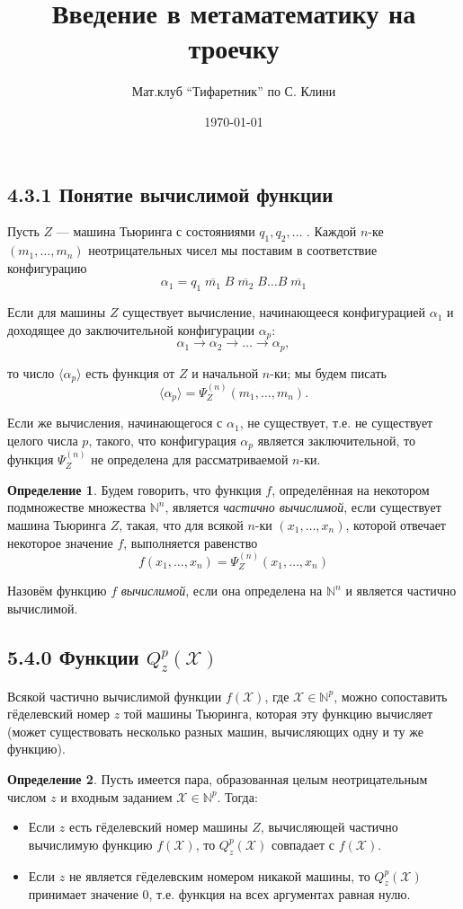 \documentclass[a4paper, 12pt]{article}  %
\author{Мат.клуб ``Тифаретник'' по С. Клини}
\title{Введение в метаматематику на троечку}
\date{\today}
\theoremstyle{definition}
\newtheorem*{definition}{Определение}
\begin{document}
	\subsection*{4.3.1 Понятие вычислимой функции}
		
		Пусть $Z$ --- машина Тьюринга с состояниями $q_1, q_2, \dots$ . Каждой $n$-ке $(m_1, \dots, m_n)$
		неотрицательных чисел мы поставим в соответствие конфигурацию 
			$$ \alpha_1 = q_1 \; \overline{m_1} \; B \; \overline{m_2} \; B \dots B \; \overline{m_1} $$
		
		Если для машины $Z$ существует вычисление, начинающееся конфигурацией $\alpha_1$ и доходящее до
		заключительной конфигурации $\alpha_p$:
			$$ \alpha_1 \rightarrow \alpha_2 \rightarrow \dots \rightarrow \alpha_p ,$$
		
		то число $\langle \alpha_p \rangle$ есть функция от $Z$ и начальной $n$-ки; мы будем писать
			$$ \langle \alpha_p \rangle = \Psi^{(n)}_Z(m_1, \dots, m_n) . $$
		
		Если же вычисления, начинающегося с $\alpha_1$, не существует, т.е. не существует целого числа $p$,
		такого, что конфигурация $\alpha_p$ является заключительной, то функция $\Psi^{(n)}_Z$ не
		определена для рассматриваемой $n$-ки.
		
		\begin{definition}
			Будем говорить, что функция $f$, определённая на некотором подмножестве множества
			$\mathbb{N}^n$, является \textit{частично вычислимой}, если существует машина Тьюринга $Z$,
			такая, что для всякой $n$-ки $(x_1, \dots, x_n)$, которой отвечает некоторое значение $f$,
			выполняется равенство
				$$f(x_1, \dots, x_n) = \Psi^{(n)}_Z(x_1, \dots, x_n)$$
			
			Назовём функцию $f$ \textit{вычислимой}, если она определена на $\mathbb{N}^n$ и является
			частично вычислимой. 
		\end{definition}
		
	\subsection*{5.4.0 Функции $Q^p_z(\mathscr{X})$}
		
		Всякой частично вычислимой функции $f(\mathscr{X})$, где $\mathscr{X} \in \mathbb{N}^p$, можно
		сопоставить гёделевский номер $z$ той машины Тьюринга, которая эту функцию вычисляет (может
		существовать несколько разных машин, вычисляющих одну и ту же функцию).
		
		\begin{definition}
			Пусть имеется пара, образованная целым неотрицательным числом $z$ и входным заданием
			$\mathscr{X} \in \mathbb{N}^p$. Тогда:
			\begin{itemize}
				\item Если $z$ есть гёделевский номер машины $Z$, вычисляющей частично вычислимую функцию
				$f(\mathscr{X})$, то $Q^p_z(\mathscr{X})$ совпадает с $f(\mathscr{X})$. 
				\item Если $z$ не является гёделевским номером никакой машины, то $Q^p_z(\mathscr{X})$
				принимает значение $0$, т.е. функция на всех аргументах равная нулю.
			\end{itemize}
		\end{definition}
	
\end{document}
